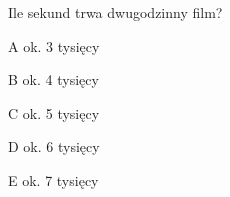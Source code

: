 \begin{tresc}
Ile sekund trwa dwugodzinny film?
\end{tresc}
\begin{wariant}{A} ok. 3 tysięcy \end{wariant}
\begin{wariant}{B} ok. 4 tysięcy \end{wariant}
\begin{wariant}{C} ok. 5 tysięcy \end{wariant}
\begin{wariant}{D} ok. 6 tysięcy \end{wariant}
\begin{wariant}{E} ok. 7 tysięcy \end{wariant}
